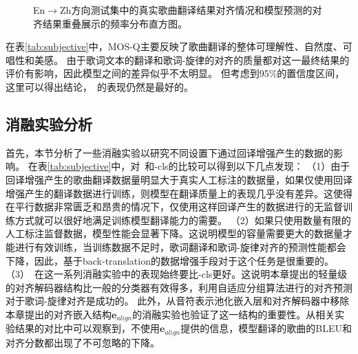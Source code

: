 \begin{figure}[ht]
    \centering
{}
\caption{En$\rightarrow$Zh方向测试集中的真实歌曲翻译结果对齐情况和模型预测的对齐结果重叠展示的频率分布直方图。}
\label{fig:align_hist2}
\end{figure}
在表\ref{tab:subjective}中，MOS-Q主要反映了歌曲翻译的整体可理解性、自然度、可唱性和美感。
由于歌词文本的翻译和歌词-旋律的对齐的质量都对这一最终结果的评价有影响，因此模型之间的差异似乎不太明显。
但考虑到95\%的置信度区间，这里可以得出结论，\modelname~的表现仍然是最好的。
\subsection{消融实验分析}
首先，本节分析了一些消融实验以研究不同设置下通过回译增强产生的数据的影响。
在表\ref{tab:subjective}中，对\modelname~和\modelname-cls的比较可以得到以下几点发现：
（1）由于回译增强产生的歌曲翻译数据量明显大于真实人工标注的数据量，如果仅使用回译增强产生的翻译数据进行训练，则模型在翻译质量上的表现几乎没有差异。这使得在平行数据非常匮乏和昂贵的情况下，仅使用这样回译产生的数据进行的无监督训练方式就可以很好地满足训练模型翻译能力的需要。
（2）如果只使用数量有限的人工标注监督数据，模型性能会显著下降。这说明模型的容量需要更大的数据量才能进行有效训练，当训练数据不足时，歌词翻译和歌词-旋律对齐的预测性能都会下降，因此，基于back-translation的数据增强手段对于这个任务是很重要的。
（3）\modelname~在这一系列消融实验中的表现始终要比\modelname-cls更好。这说明本章提出的轻量级的对齐解码器结构比一般的分类器有效得多，利用自适应分组算法进行的对齐预测对于歌词-旋律对齐是成功的。
此外，从音符表示池化嵌入层和对齐解码器中移除本章提出的对齐嵌入结构$\mathbf{e}_{align}$的消融实验也验证了这一结构的重要性。从相关实验结果的对比中可以观察到，不使用$\mathbf{e}_{align}$提供的信息，模型翻译的歌曲的BLEU和对齐分数都出现了不可忽略的下降。

